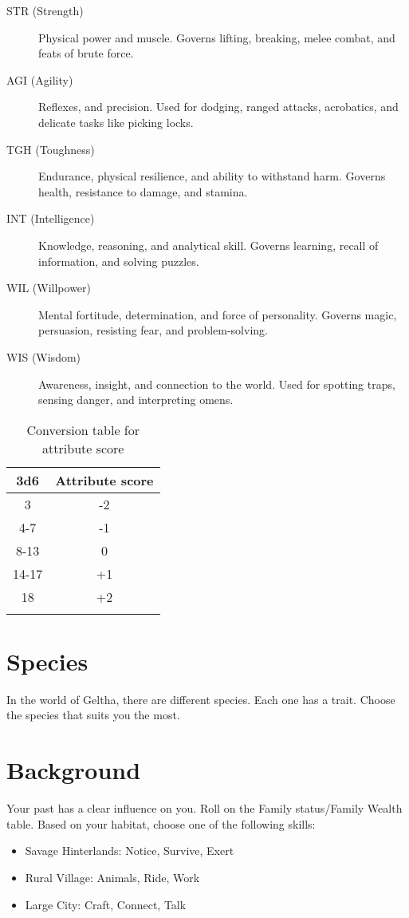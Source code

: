 \documentclass[itdr/core]{subfiles}
\begin{document}
\begin{description}
\item[STR (Strength)] Physical power and muscle. Governs lifting, breaking, melee combat, and feats of brute force.
\item[AGI (Agility)] Reflexes, and precision. Used for dodging, ranged attacks, acrobatics, and delicate tasks like picking locks.
\item[TGH (Toughness)] Endurance, physical resilience, and ability to withstand harm. Governs health, resistance to damage, and stamina.
\item[INT (Intelligence)] Knowledge, reasoning, and analytical skill. Governs learning, recall of information, and solving puzzles.
\item[WIL (Willpower)] Mental fortitude, determination, and force of personality. Governs magic, persuasion, resisting fear, and problem-solving.
\item[WIS (Wisdom)] Awareness, insight, and connection to the world. Used for spotting traps, sensing danger, and interpreting omens.
\end{description}

\begin{longtable}{cc}
\hline
\textbf{3d6} & \textbf{Attribute score} \\
\hline
3 & -2 \\
4-7 & -1 \\
8-13 & 0 \\
14-17 & +1 \\
18 & +2 \\
\hline
\caption{Conversion table for attribute score}
\label{table:attribute-conversion}
\end{longtable}

\section{Species} %
\label{sec:species}
In the world of Geltha, there are different species. Each one has a trait. Choose the species that suits you the most.


\section{Background}
Your past has a clear influence on you. Roll on the Family status/Family Wealth table.
Based on your habitat, choose one of the following skills:

\begin{itemize}
\item Savage Hinterlands: Notice, Survive, Exert
\item Rural Village: Animals, Ride, Work
\item Large City: Craft, Connect, Talk
\end{itemize}
\end{document}
